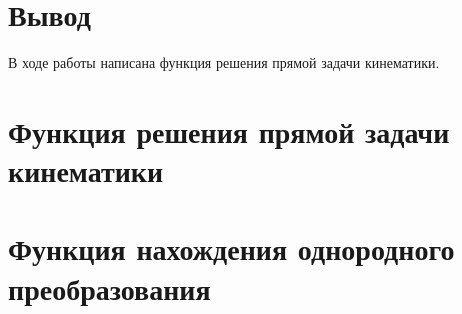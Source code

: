 \documentclass[14pt]{extarticle}
\begin{document}
    \section*{Вывод}
    В ходе работы написана функция решения прямой задачи кинематики.

    \appendix
    \renewcommand{\thesection}{\Asbuk{section}}
    \section{Функция решения прямой задачи кинематики}\label{code:fk}

    \section{Функция нахождения однородного преобразования}\label{code:ht}
\end{document}
